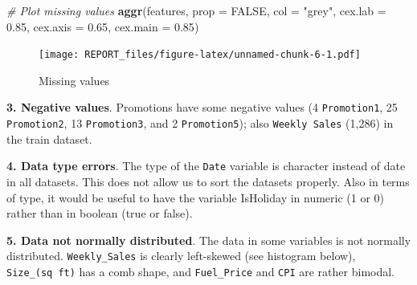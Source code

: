 \documentclass[11pt,]{article}
\newenvironment{Shaded}{\begin{snugshade}}{\end{snugshade}}
\newcommand{\KeywordTok}[1]{\textcolor[rgb]{0.13,0.29,0.53}{\textbf{{#1}}}}
\newcommand{\DataTypeTok}[1]{\textcolor[rgb]{0.13,0.29,0.53}{{#1}}}
\newcommand{\FloatTok}[1]{\textcolor[rgb]{0.00,0.00,0.81}{{#1}}}
\newcommand{\StringTok}[1]{\textcolor[rgb]{0.31,0.60,0.02}{{#1}}}
\newcommand{\CommentTok}[1]{\textcolor[rgb]{0.56,0.35,0.01}{\textit{{#1}}}}
\newcommand{\OtherTok}[1]{\textcolor[rgb]{0.56,0.35,0.01}{{#1}}}
\newcommand{\NormalTok}[1]{{#1}}
\begin{document}
\begin{Shaded}
\begin{Highlighting}[]
\CommentTok{# Plot missing values}
\KeywordTok{aggr}\NormalTok{(features, }\DataTypeTok{prop =} \OtherTok{FALSE}\NormalTok{, }\DataTypeTok{col =} \StringTok{"grey"}\NormalTok{, }\DataTypeTok{cex.lab =} \FloatTok{0.85}\NormalTok{, }\DataTypeTok{cex.axis =} \FloatTok{0.65}\NormalTok{, }
    \DataTypeTok{cex.main =} \FloatTok{0.85}\NormalTok{)}
\end{Highlighting}
\end{Shaded}

\begin{figure}[htbp]
\centering
\texttt{[image: REPORT\_files/figure-latex/unnamed-chunk-6-1.pdf]}
\caption{Missing values}
\end{figure}

\textbf{3. Negative values}. Promotions have some negative values (4
\texttt{Promotion1}, 25 \texttt{Promotion2}, 13 \texttt{Promotion3}, and
2 \texttt{Promotion5}); also \texttt{Weekly\ Sales} (1,286) in the train
dataset.

\textbf{4. Data type errors}. The type of the \texttt{Date} variable is
character instead of date in all datasets. This does not allow us to
sort the datasets properly. Also in terms of type, it would be useful to
have the variable IsHoliday in numeric (1 or 0) rather than in boolean
(true or false).

\textbf{5. Data not normally distributed}. The data in some variables is
not normally distributed. \texttt{Weekly\_Sales} is clearly left-skewed
(see histogram below), \texttt{Size\_(sq\ ft)} has a comb shape, and
\texttt{Fuel\_Price} and \texttt{CPI} are rather bimodal.

\begin{Shaded}
\end{Shaded}
\end{document}

